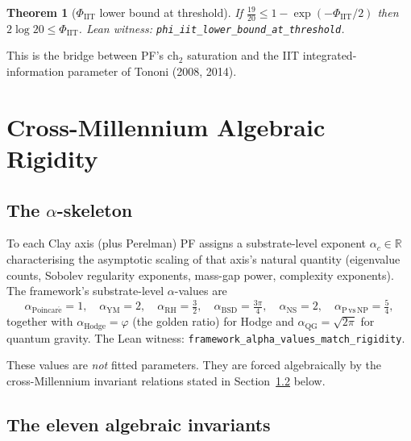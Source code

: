 \documentclass[11pt,a4paper]{article}
\newtheorem{theorem}{Theorem}[section]
\theoremstyle{definition}
\theoremstyle{remark}
\newcommand{\reals}{\mathbb{R}}
\newcommand{\Phiiit}{\Phi_{\mathrm{IIT}}}
\newcommand{\chtwo}{\mathrm{ch}_{2}}
\newcommand{\alphaRH}{\alpha_{\mathrm{RH}}}
\newcommand{\alphaYM}{\alpha_{\mathrm{YM}}}
\newcommand{\alphaP}{\alpha_{\mathrm{Poincar\acute{e}}}}
\newcommand{\alphaBSD}{\alpha_{\mathrm{BSD}}}
\newcommand{\alphaNS}{\alpha_{\mathrm{NS}}}
\newcommand{\alphaH}{\alpha_{\mathrm{Hodge}}}
\newcommand{\alphaNP}{\alpha_{\mathrm{P\,vs\,NP}}}
\newcommand{\alphaQG}{\alpha_{\mathrm{QG}}}
\newcommand{\lean}[1]{\texttt{\small #1}}
\begin{document}
\begin{theorem}[$\Phiiit$ lower bound at threshold]\label{thm:phiiit-bound}
If $\frac{19}{20} \le 1 - \exp(-\Phiiit / 2)$ then
$2 \log 20 \le \Phiiit$. Lean witness:
\lean{phi\_iit\_lower\_bound\_at\_threshold}.
\end{theorem}

This is the bridge between PF's $\chtwo$ saturation and the IIT
integrated-information parameter of Tononi (2008, 2014).

\section{Cross-Millennium Algebraic Rigidity}
\label{sec:rigidity}

\subsection{The $\alpha$-skeleton}

To each Clay axis (plus Perelman) PF assigns a substrate-level
exponent $\alpha_{c} \in \reals$ characterising the asymptotic
scaling of that axis's natural quantity (eigenvalue counts,
Sobolev regularity exponents, mass-gap power, complexity
exponents). The framework's substrate-level $\alpha$-values are
\begin{equation}
\label{eq:alpha-skeleton}
  \alphaP = 1, \quad
  \alphaYM = 2, \quad
  \alphaRH = \tfrac{3}{2}, \quad
  \alphaBSD = \tfrac{3\pi}{4}, \quad
  \alphaNS = 2, \quad
  \alphaNP = \tfrac{5}{4},
\end{equation}
together with
\(
  \alphaH = \varphi
\)
(the golden ratio) for Hodge and
\(
  \alphaQG = \sqrt{2\pi}
\)
for quantum gravity. The Lean witness:
\lean{framework\_alpha\_values\_match\_rigidity}.

These values are \emph{not} fitted parameters. They are forced
algebraically by the cross-Millennium invariant relations stated
in Section~\ref{sec:eleven-invariants} below.

\subsection{The eleven algebraic invariants}
\label{sec:eleven-invariants}
\end{document}
